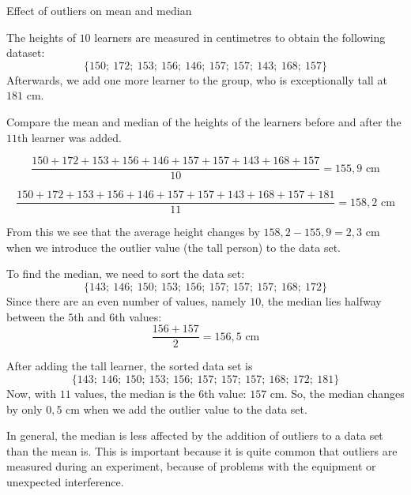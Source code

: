 \begin{wex}{Effect of outliers on mean and median}{
    The heights of $10$ learners are measured in centimetres to obtain
    the following dataset:
    \begin{equation}
      \{150;\ 172;\ 153;\ 156;\ 146;\ 157;\ 157;\ 143;\ 168;\ 157\}
    \end{equation}
    Afterwards, we add one more learner to the group, who is
    exceptionally tall at $181$ cm.

    Compare the mean and median of the heights of the learners before
    and after the $11$th learner was added.
}{

  \begin{equation}
    \frac{150 + 172 + 153 + 156 + 146 + 157 + 157 + 143 + 168 + 157}{10}
    = 155,9\textrm{ cm}
  \end{equation}


  \begin{equation}
    \frac{150 + 172 + 153 + 156 + 146 + 157 + 157 + 143 + 168 + 157 + 181}{11}
    = 158,2\textrm{ cm}
  \end{equation}

  From this we see that the average height changes by
  $158,2 - 155,9 = 2,3\textrm{ cm}$ when we introduce
  the outlier value (the tall person) to the data set.


  To find the median, we need to sort the data set:
  \begin{equation}
    \{143;\ 146;\ 150;\ 153;\ 156;\ 157;\ 157;\ 157;\ 168;\ 172\}
  \end{equation}
  Since there are an even number of values, namely $10$, the median
  lies halfway between the $5$th and $6$th values:
  \begin{equation}
    \frac{156+157}{2} = 156,5\textrm{ cm}
  \end{equation}


  After adding the tall learner, the sorted data set is
  \begin{equation}
    \{143;\ 146;\ 150;\ 153;\ 156;\ 157;\ 157;\ 157;\ 168;\ 172;\ 181\}
  \end{equation}
  Now, with $11$ values, the median is the $6$th value: $157$ cm.
  So, the median changes by only $0,5$ cm when we add the outlier
  value to the data set.

  In general, the median is less affected by the addition of outliers
  to a data set than the mean is. This is important because it is
  quite common that outliers are measured during an experiment,
  because of problems with the equipment or unexpected interference.

}
\end{wex}

